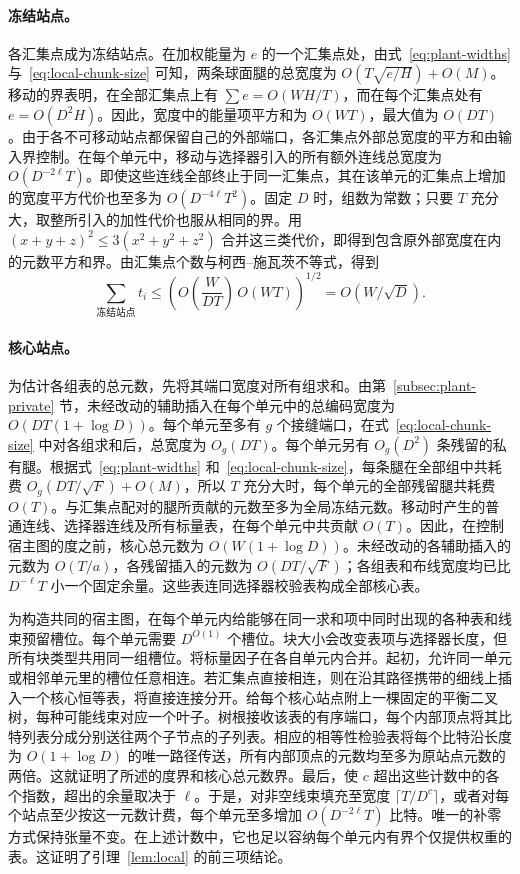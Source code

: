 \paragraph{冻结站点。}各汇集点成为冻结站点。在加权能量为 \(e\) 的一个汇集点处，由式~\eqref{eq:plant-widths} 与~\eqref{eq:local-chunk-size} 可知，两条球面腿的总宽度为 \(O(T\sqrt{e/H})+O(M)\)。移动的界表明，在全部汇集点上有 \(\sum e=O(WH/T)\)，而在每个汇集点处有 \(e=O(D^2H)\)。因此，宽度中的能量项平方和为 \(O(WT)\)，最大值为 \(O(DT)\)。由于各不可移动站点都保留自己的外部端口，各汇集点外部总宽度的平方和由输入界控制。在每个单元中，移动与选择器引入的所有额外连线总宽度为 \(O(D^{-2\ell}T)\)。即使这些连线全部终止于同一汇集点，其在该单元的汇集点上增加的宽度平方代价也至多为 \(O(D^{-4\ell}T^2)\)。固定 \(D\) 时，组数为常数；只要 \(T\) 充分大，取整所引入的加性代价也服从相同的界。用 \((x+y+z)^2\le3(x^2+y^2+z^2)\) 合并这三类代价，即得到包含原外部宽度在内的元数平方和界。由汇集点个数与柯西–施瓦茨不等式，得到 \[
 \sum_{\text{冻结站点}}t_i\le
 \left(O\!\left(\frac W{DT}\right)\,O(WT)\right)^{1/2}
 =O(W/\sqrt D).
\]

\paragraph{核心站点。}为估计各组表的总元数，先将其端口宽度对所有组求和。由第~\ref{subsec:plant-private} 节，未经改动的辅助插入在每个单元中的总编码宽度为 \(O(DT(1+\log D))\)。每个单元至多有 \(g\) 个接缝端口，在式~\eqref{eq:local-chunk-size} 中对各组求和后，总宽度为 \(O_g(DT)\)。每个单元另有 \(O_g(D^2)\) 条残留的私有腿。根据式~\eqref{eq:plant-widths} 和~\eqref{eq:local-chunk-size}，每条腿在全部组中共耗费 \(O_g(DT/\sqrt F)+O(M)\)，所以 \(T\) 充分大时，每个单元的全部残留腿共耗费 \(O(T)\)。与汇集点配对的腿所贡献的元数至多为全局冻结元数。移动时产生的普通连线、选择器连线及所有标量表，在每个单元中共贡献 \(O(T)\)。因此，在控制宿主图的度之前，核心总元数为 \(O(W(1+\log D))\)。未经改动的各辅助插入的元数为 \(O(T/a)\)，各残留插入的元数为 \(O(DT/\sqrt F)\)；各组表和布线宽度均已比 \(D^{-\ell}T\) 小一个固定余量。这些表连同选择器校验表构成全部核心表。

为构造共同的宿主图，在每个单元内给能够在同一求和项中同时出现的各种表和线束预留槽位。每个单元需要 \(D^{O(1)}\) 个槽位。块大小会改变表项与选择器长度，但所有块类型共用同一组槽位。将标量因子在各自单元内合并。起初，允许同一单元或相邻单元里的槽位任意相连。若汇集点直接相连，则在沿其路径携带的细线上插入一个核心恒等表，将直接连接分开。给每个核心站点附上一棵固定的平衡二叉树，每种可能线束对应一个叶子。树根接收该表的有序端口，每个内部顶点将其比特列表分成分别送往两个子节点的子列表。相应的相等性检验表将每个比特沿长度为 \(O(1+\log D)\) 的唯一路径传送，所有内部顶点的元数均至多为原站点元数的两倍。这就证明了所述的度界和核心总元数界。最后，使 \(c\) 超出这些计数中的各个指数，超出的余量取决于 \(\ell\)。于是，对非空线束填充至宽度 \(\lceil T/D^c\rceil\)，或者对每个站点至少按这一元数计费，每个单元至多增加 \(O(D^{-2\ell}T)\) 比特。唯一的补零方式保持张量不变。在上述计数中，它也足以容纳每个单元内有界个仅提供权重的表。这证明了引理~\ref{lem:local} 的前三项结论。

